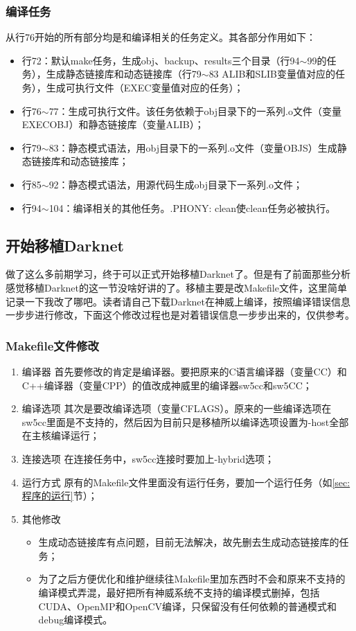 \subsubsection{编译任务}
从行76开始的所有部分均是和编译相关的任务定义。其各部分作用如下：
\begin{itemize}
	\item 行72：默认make任务，生成obj、backup、results三个目录（行94$\sim$99的任务），生成静态链接库和动态链接库（行79$\sim$83 ALIB和SLIB变量值对应的任务），生成可执行文件（EXEC变量值对应的任务）；
	\item 行76$\sim$77：生成可执行文件。该任务依赖于obj目录下的一系列.o文件（变量EXECOBJ）和静态链接库（变量ALIB）；
	\item 行79$\sim$83：静态模式语法，用obj目录下的一系列.o文件（变量OBJS）生成静态链接库和动态链接库；
	\item 行85$\sim$92：静态模式语法，用源代码生成obj目录下一系列.o文件；
	\item 行94$\sim$104：编译相关的其他任务。.PHONY: clean使clean任务必被执行。
\end{itemize}

\subsection{开始移植Darknet}
做了这么多前期学习，终于可以正式开始移植Darknet了。但是有了前面那些分析感觉移植Darknet的这一节没啥好讲的了。移植主要是改Makefile文件，这里简单记录一下我改了哪吧。读者请自己下载Darknet在神威上编译，按照编译错误信息一步步进行修改，下面这个修改过程也是对着错误信息一步步出来的，仅供参考。

\subsubsection{Makefile文件修改}
\begin{enumerate}
	\item 编译器
	      首先要修改的肯定是编译器。要把原来的C语言编译器（变量CC）和C++编译器（变量CPP）的值改成神威里的编译器{\codefont sw5cc}和{\codefont sw5CC}；
	\item 编译选项
	      其次是要改编译选项（变量CFLAGS）。原来的一些编译选项在{\codefont sw5cc}里面是不支持的，然后因为目前只是移植所以编译选项设置为{\codefont -host}全部在主核编译运行；
	\item 连接选项
	      在连接任务中，sw5cc连接时要加上{\codefont -hybrid}选项；
	\item 运行方式
	      原有的Makefile文件里面没有运行任务，要加一个运行任务（如\ref{sec:程序的运行}节）；
	\item 其他修改
	      \begin{itemize}
		      \item 生成动态链接库有点问题，目前无法解决，故先删去生成动态链接库的任务；
		      \item 为了之后方便优化和维护继续往Makefile里加东西时不会和原来不支持的编译模式弄混，最好把所有神威系统不支持的编译模式删掉，包括CUDA、OpenMP和OpenCV编译，只保留没有任何依赖的普通模式和debug编译模式。
	      \end{itemize}
\end{enumerate}

